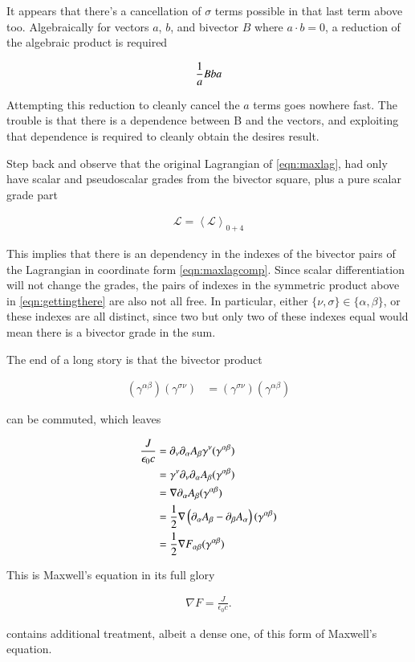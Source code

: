 \documentclass{article}
\newcommand{\LL}[0]{\mathcal{L}}
\newcommand{\grad}[0]{\nabla}
\newcommand{\gpgrade}[2] {{\left\langle{{#1}}\right\rangle}_{#2}}
\begin{document}
It appears that there's a cancellation of $\sigma$ terms possible in that last term above too.  Algebraically
for vectors $a$, $b$, and bivector $B$ where $a \cdot b = 0$, a reduction of the algebraic product is required

\begin{align*}
\frac{1}{a} B b a
\end{align*}

Attempting this reduction to cleanly cancel the $a$ terms goes nowhere fast.  The trouble is that there
is a dependence between B and the vectors, and exploiting that dependence is required to cleanly obtain the desires
result.

Step back and observe that the original Lagrangian of \ref{eqn:maxlag}, 
had only have scalar and pseudoscalar grades from the bivector square, plus a pure scalar grade part

\begin{align*}
\LL = \gpgrade{\LL}{0+4}
\end{align*}

This implies that there is an dependency in the indexes of the
bivector pairs of the Lagrangian in coordinate form \ref{eqn:maxlagcomp}.
Since scalar differentiation will not change the grades, the pairs
of indexes in the symmetric product above in \ref{eqn:gettingthere} are also not all free.
In particular, either $\{\nu, \sigma\} \in \{\alpha, \beta\}$, or these indexes are all distinct, since two but only two
of these indexes equal would mean there is a bivector grade in the sum.  

The end of a long story is that the bivector product

\begin{align*}
(\gamma^{\alpha\beta}) (\gamma^{\sigma\nu})
&=
(\gamma^{\sigma\nu}) (\gamma^{\alpha\beta})
\end{align*}

can be commuted, which leaves

\begin{align*}
\frac{J}{\epsilon_0 c}
&= \partial_\nu \partial_\alpha A_\beta \gamma^{\nu} (\gamma^{\alpha\beta}) \\
&= \gamma^\nu \partial_\nu \partial_\alpha A_\beta (\gamma^{\alpha\beta}) \\
&= \grad \partial_\alpha A_\beta (\gamma^{\alpha\beta}) \\
&= \inv{2} \grad \left(\partial_\alpha A_\beta - \partial_\beta A_\alpha \right) (\gamma^{\alpha\beta}) \\
&= \inv{2} \grad F_{\alpha\beta} (\gamma^{\alpha\beta}) \\
\end{align*}

This is Maxwell's equation in its full glory

\begin{align}
\grad F = \frac{J}{\epsilon_0 c}.
\end{align}

\cite{doran2003gap} contains additional treatment, albeit a dense one, of 
this form of Maxwell's equation.

\end{document}
